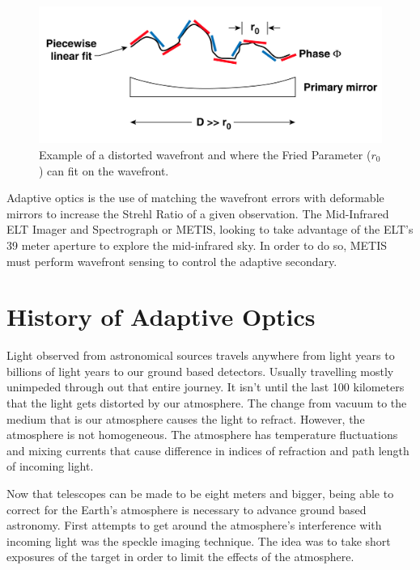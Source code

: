 \begin{figure}[h!]
\centering
\includegraphics[width=14cm]{Figures/r0.png}
\caption{Example of a distorted wavefront and where the Fried Parameter ($r_0$) can fit on the wavefront.}
\label{fig:ELT_las}
\end{figure}

Adaptive optics is the use of matching the wavefront errors  
with deformable mirrors to increase the Strehl Ratio of a given observation.  The  
Mid-Infrared ELT Imager and Spectrograph or METIS, looking to take advantage of the
ELT's 39 meter aperture to explore the mid-infrared sky.  In order to do so, METIS
must perform wavefront sensing to control the adaptive secondary.


\section{History of Adaptive Optics}


Light observed from astronomical sources travels anywhere from light years to
billions of light years to our ground based detectors.  Usually travelling mostly
unimpeded through out that entire journey.  It isn't until the last 100 kilometers
that the light gets distorted by our atmosphere.  The change from vacuum to the
medium that is our atmosphere causes the light to refract.  However, the atmosphere
is not homogeneous.  The atmosphere has temperature fluctuations and mixing currents
that cause difference in indices of refraction and path length of incoming light.


Now that telescopes can be made to be eight meters and bigger,
being able to correct for the Earth's atmosphere is necessary 
to advance ground based astronomy.  First attempts to get around the atmosphere's 
interference with incoming light was the speckle imaging technique.  The idea was 
to take short exposures of the target in order to limit the effects of the
atmosphere.

